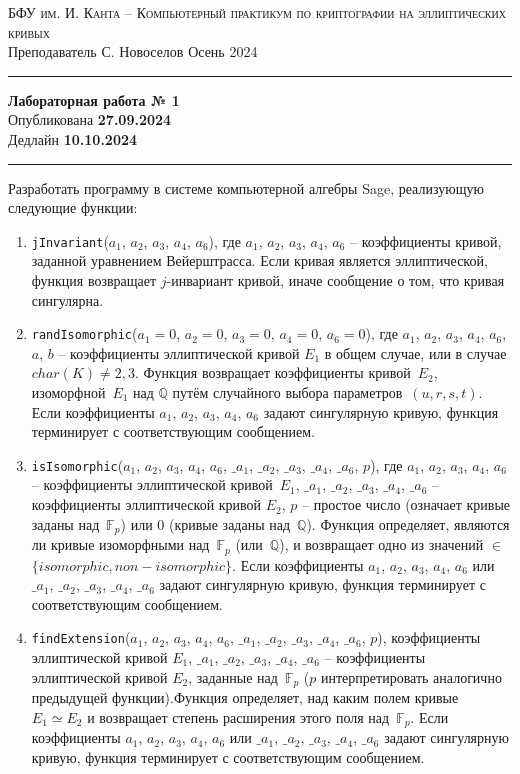 \documentclass[11pt]{exam}
\theoremstyle{definition}
\begin{document}
	
	{\noindent
		\textsc{БФУ им. И. Канта -- Компьютерный практикум по криптографии на эллиптических кривых }\\[5pt]
		Преподаватель {С. Новоселов}   \hfill{Осень 2024\\}
	\hrule
	\begin{center}
		{\LARGE\textbf{
				Лабораторная работа № 1 \\[5pt]
		}} 
			Опубликована \textbf{27.09.2024} \\[5pt] 
			Дедлайн \textbf{10.10.2024}
		
	\end{center}
	\hrule \vspace{5mm}
	
	\thispagestyle{empty}
	
    Разработать программу в системе компьютерной алгебры Sage, реализующую следующие функции:

\begin{enumerate}
	\item \texttt{jInvariant}($a_1$, $a_2$, $a_3$, $a_4$, $a_6$), где $a_1$, $a_2$, $a_3$, $a_4$, $a_6$ -- коэффициенты кривой, заданной уравнением Вейерштрасса. Если кривая является эллиптической, функция возвращает $j$-инвариант кривой, иначе сообщение о том, что кривая сингулярна.
	\item \texttt{randIsomorphic}($a_1 = 0$, $a_2 = 0$, $a_3 = 0$, $a_4 = 0$, $a_6 = 0$), где $a_1$, $a_2$, $a_3$, $a_4$, $a_6$, $a$, $b$ -- коэффициенты эллиптической кривой $E_1$ в общем случае, или в случае $char(K)\neq 2, 3$. Функция возвращает коэффициенты кривой~$E_2$, изоморфной~$E_1$ над $\mathbb{Q}$ путём случайного выбора параметров~$(u, r, s, t)$. Если коэффициенты $a_1$, $a_2$, $a_3$, $a_4$, $a_6$ задают сингулярную кривую, функция терминирует с соответствующим сообщением.
	\item \texttt{isIsomorphic}($a_1$, $a_2$, $a_3$, $a_4$, $a_6$, $\_a_1$, $\_a_2$, $\_a_3$, $\_a_4$, $\_a_6$, $p$), где $a_1$, $a_2$, $a_3$, $a_4$, $a_6$ -- коэффициенты эллиптической кривой~$E_1$, $\_a_1$, $\_a_2$, $\_a_3$, $\_a_4$, $\_a_6$ -- коэффициенты эллиптической кривой $E_2$, $p$ -- простое число (означает кривые заданы над~$\mathbb{F}_p$) или $0$ (кривые заданы над~$\mathbb{Q}$). Функция определяет, являются ли кривые изоморфными над~$\mathbb{F}_p$ (или~$\mathbb{Q}$), и возвращает одно из значений $\in$ $\{isomorphic, non-isomorphic\}$. Если коэффициенты $a_1$, $a_2$, $a_3$, $a_4$, $a_6$ или $\_a_1$, $\_a_2$, $\_a_3$, $\_a_4$, $\_a_6$ задают сингулярную кривую, функция терминирует с соответствующим сообщением.
	\item \texttt{findExtension}($a_1$, $a_2$, $a_3$, $a_4$, $a_6$, $\_a_1$, $\_a_2$, $\_a_3$, $\_a_4$, $\_a_6$, $p$), коэффициенты эллиптической кривой $E_1$,
	$\_a_1$, $\_a_2$, $\_a_3$, $\_a_4$, $\_a_6$ -- коэффициенты эллиптической кривой $E_2$, заданные над~$\mathbb{F}_p$ ($p$ интерпретировать аналогично предыдущей функции).Функция определяет, над каким полем кривые~$E_1 \simeq E_2$ и возвращает степень расширения этого поля над~$\mathbb{F}_p$. Если коэффициенты $a_1$, $a_2$, $a_3$, $a_4$, $a_6$ или $\_a_1$, $\_a_2$, $\_a_3$, $\_a_4$, $\_a_6$ задают сингулярную кривую, функция терминирует с соответствующим сообщением.
\end{enumerate}

}
\end{document}
